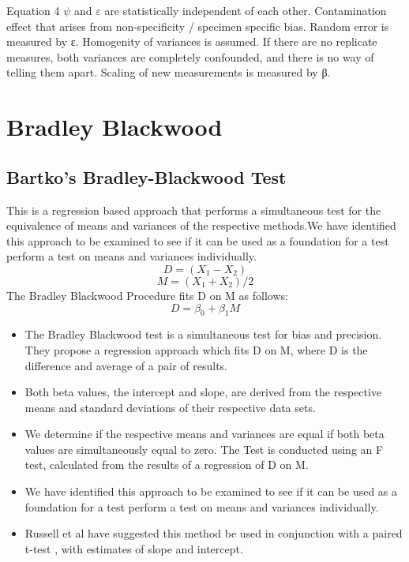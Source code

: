 \documentclass[12pt, a4paper]{report}
\theoremstyle{plain}
\theoremstyle{definition}
\theoremstyle{remark}
\begin{document}
Equation 4 
$\psi$  and $\varepsilon$ are statistically independent of each other.
Contamination effect that arises from non-specificity /  specimen specific bias.
Random error is measured by ε. Homogenity of variances is assumed.
If there are no replicate measures,  both variances are completely confounded, and there is no way of telling them apart.
Scaling of new measurements is measured by β.


	\chapter{Bradley Blackwood}
	\section{Bartko's Bradley-Blackwood Test}
	This is a regression based
	approach that performs a simultaneous test for the equivalence of
	means and variances of the respective methods.We have identified
	this approach  to be examined to see if it can be used as a
	foundation for a test perform a test on
	means and variances individually.
	\begin{equation}
	D = (X_{1}-X_{2})
	\end{equation}
	\begin{equation}
	M = (X_{1} + X_{2}) /2
	\end{equation}
	The Bradley Blackwood Procedure fits D on M as follows:\\
	\begin{equation}
	D = \beta_{0} + \beta_{1}M
	\end{equation}
	\begin{itemize}
		\item The Bradley Blackwood test is a simultaneous test for bias and
		precision. They propose a regression approach which fits D on M,
		where D is the difference and average of a pair of results.
		\item Both beta values, the intercept and slope, are derived from the respective means and
		standard deviations of their respective data sets.
		\item We determine if the respective means and variances are equal if
		both beta values are simultaneously equal to zero. The Test is
		conducted using an F test, calculated from the results of a
		regression of D on M.
		\item We have identified this approach  to be examined to see if it can
		be used as a foundation for a test perform a test on means and
		variances individually.
		\item Russell et al have suggested this method be used in conjunction
		with a paired t-test , with estimates of slope and intercept.
	\end{itemize}
	
\end{document}
